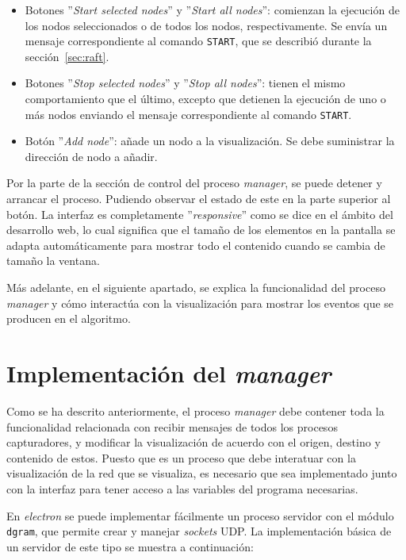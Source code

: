 \begin{itemize}
\item Botones ''\textit{Start selected nodes}'' y ''\textit{Start all nodes}'': comienzan la ejecución de los nodos seleccionados o de todos los nodos, respectivamente. Se envía un mensaje correspondiente al comando \texttt{START}, que se describió durante la sección~\ref{sec:raft}.

\item Botones ''\textit{Stop selected nodes}'' y ''\textit{Stop all nodes}'': tienen el mismo comportamiento que el último, excepto que detienen la ejecución de uno o más nodos enviando el mensaje correspondiente al comando \texttt{START}.

\item Botón ''\textit{Add node}'': añade un nodo a la visualización. Se debe suministrar la dirección de nodo a añadir.
\end{itemize}

Por la parte de la sección de control del proceso \textit{manager}, se puede detener y arrancar el proceso. Pudiendo observar el estado de este en la parte superior al botón. La interfaz es completamente ''\textit{responsive}'' como se dice en el ámbito del desarrollo web, lo cual significa que el tamaño de los elementos en la pantalla se adapta automáticamente para mostrar todo el contenido cuando se cambia de tamaño la ventana.

Más adelante, en el siguiente apartado, se explica la funcionalidad del proceso \textit{manager} y cómo interactúa con la visualización para mostrar los eventos que se producen en el algoritmo. 

\section{Implementación del \textit{manager}}

Como se ha descrito anteriormente, el proceso \textit{manager} debe contener toda la funcionalidad relacionada con recibir mensajes de todos los procesos capturadores, y modificar la visualización de acuerdo con el origen, destino y contenido de estos. Puesto que es un proceso que debe interatuar con la visualización de la red que se visualiza, es necesario que sea implementado junto con la interfaz para tener acceso a las variables del programa necesarias.

En \textit{electron} se puede implementar fácilmente un proceso servidor con el módulo \texttt{dgram}, que permite crear y manejar \textit{sockets} UDP. La implementación básica de un servidor de este tipo se muestra a continuación:

